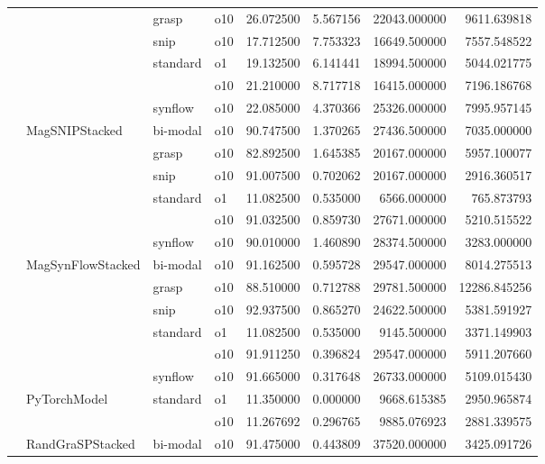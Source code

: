 \begin{longtable}{llllrrrr}
      &     & grasp & o10 &  26.072500 &   5.567156 &     22043.000000 &   9611.639818 \\
      &     & snip & o10 &  17.712500 &   7.753323 &     16649.500000 &   7557.548522 \\
      &     & standard & o1 &  19.132500 &   6.141441 &     18994.500000 &   5044.021775 \\
      &     &         & o10 &  21.210000 &   8.717718 &     16415.000000 &   7196.186768 \\
      &     & synflow & o10 &  22.085000 &   4.370366 &     25326.000000 &   7995.957145 \\
      & MagSNIPStacked & bi-modal & o10 &  90.747500 &   1.370265 &     27436.500000 &   7035.000000 \\
      &     & grasp & o10 &  82.892500 &   1.645385 &     20167.000000 &   5957.100077 \\
      &     & snip & o10 &  91.007500 &   0.702062 &     20167.000000 &   2916.360517 \\
      &     & standard & o1 &  11.082500 &   0.535000 &      6566.000000 &    765.873793 \\
      &     &         & o10 &  91.032500 &   0.859730 &     27671.000000 &   5210.515522 \\
      &     & synflow & o10 &  90.010000 &   1.460890 &     28374.500000 &   3283.000000 \\
      & MagSynFlowStacked & bi-modal & o10 &  91.162500 &   0.595728 &     29547.000000 &   8014.275513 \\
      &     & grasp & o10 &  88.510000 &   0.712788 &     29781.500000 &  12286.845256 \\
      &     & snip & o10 &  92.937500 &   0.865270 &     24622.500000 &   5381.591927 \\
      &     & standard & o1 &  11.082500 &   0.535000 &      9145.500000 &   3371.149903 \\
      &     &         & o10 &  91.911250 &   0.396824 &     29547.000000 &   5911.207660 \\
      &     & synflow & o10 &  91.665000 &   0.317648 &     26733.000000 &   5109.015430 \\
      & PyTorchModel & standard & o1 &  11.350000 &   0.000000 &      9668.615385 &   2950.965874 \\
      &     &         & o10 &  11.267692 &   0.296765 &      9885.076923 &   2881.339575 \\
      & RandGraSPStacked & bi-modal & o10 &  91.475000 &   0.443809 &     37520.000000 &   3425.091726 \\

\end{longtable}
